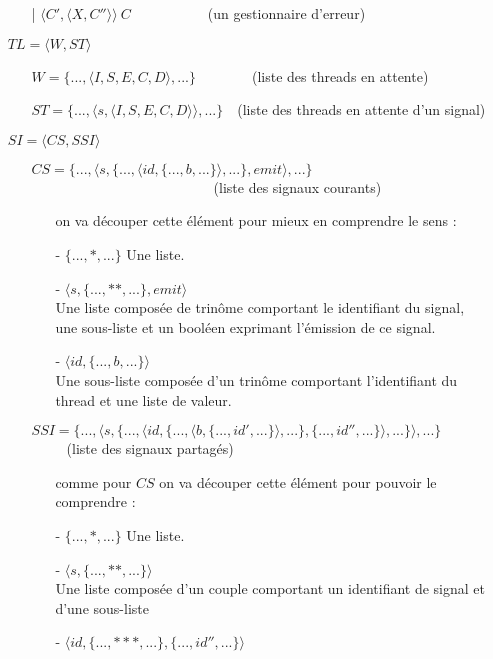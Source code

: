 \documentclass[10pt,a4paper]{report}
\begin{document}
\begin{itemize}
\begin{itemize}
  \item[|] $\langle C',\langle X,C''\rangle\rangle~C$~~~~~~~~~~~(un gestionnaire d'erreur)
  \end{itemize}
\item[] $TL = \langle W,ST\rangle$
  \begin{itemize}
  \item[] $W = \{...,\langle I,S,E,C,D\rangle,...\}$~~~~~~~~(liste des threads en attente)
  \item[] $ST = \{...,\langle s,\langle I,S,E,C,D\rangle\rangle,...\}$~~(liste des threads en attente d'un signal)
  \end{itemize}
\item[] $SI = \langle CS,SSI\rangle$
  \begin{itemize}
  \item[] $CS = \{...,\langle s,\{...,\langle id,\{...,b,...\}\rangle,...\},emit\rangle,...\}$~~~~~~~~~~~~~~~~~~~~~~~~~~(liste des signaux courants)
    \begin{itemize}
    \item[] on va découper cette élément pour mieux en comprendre le sens :
    \item[] - $\{...,*,...\}$ Une liste. 
    \item[] - $\langle s,\{...,**,...\},emit\rangle$ \\
      Une liste composée de trinôme comportant le identifiant du signal, une sous-liste et un booléen exprimant l'émission de ce signal.
    \item[] - $\langle id,\{...,b,...\}\rangle$ \\
      Une sous-liste composée d'un trinôme comportant l'identifiant du thread et une liste de valeur.
    \end{itemize}
  \item[]
  \item[] $SSI =  \{...,\langle s,\{...,\langle id,\{...,\langle b,\{...,id',...\}\rangle,...\},\{...,id'',...\}\rangle,...\}\rangle,...\}$~~~~~(liste des signaux partagés)
    \begin{itemize}
    \item[] comme pour $CS$ on va découper cette élément pour pouvoir le comprendre :
    \item[] - $\{...,*,...\}$ Une liste. 
    \item[] - $\langle s,\{...,**,...\}\rangle$\\
      Une liste composée d'un couple comportant un identifiant de signal et d'une sous-liste
    \item[] - $\langle id,\{...,***,...\},\{...,id'',...\}\rangle$\\

\end{itemize}
\end{itemize}
\end{itemize}
\end{document}
